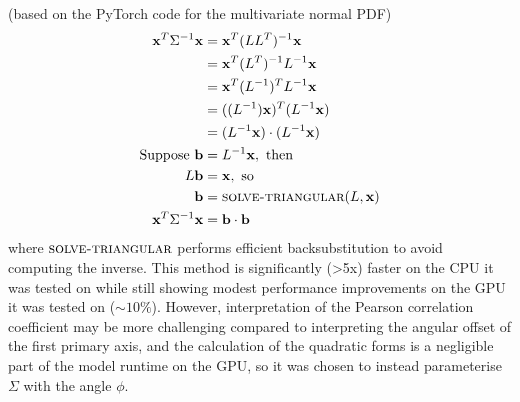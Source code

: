 \documentclass[a4paper, 12pt]{report}
\begin{document}
(based on the PyTorch code for the multivariate normal PDF)
\begin{align}
	\mathbf{x}^T\Sigma^{-1}\mathbf{x}
	&= \mathbf{x}^T(LL^T)^{-1}\mathbf{x}\\
	&= \mathbf{x}^T(L^T)^{-1}L^{-1}\mathbf{x}\\
	&= \mathbf{x}^T(L^{-1})^{T}L^{-1}\mathbf{x}\\
	&= ((L^{-1})\mathbf{x})^T(L^{-1}\mathbf{x})\\
	&= (L^{-1}\mathbf{x})\cdot(L^{-1}\mathbf{x})\\
\textrm{Suppose }\mathbf{b}&=L^{-1}\mathbf{x}, \textrm{ then} \nonumber\\
	L\mathbf{b}&=\mathbf{x}, \textrm{ so}\nonumber\\
	\mathbf{b}&= \textsc{solve-triangular}(L, \mathbf{x})\\
	\mathbf{x}^T\Sigma^{-1}\mathbf{x} &= \mathbf{b}\cdot\mathbf{b}
\end{align}
where $\textsc{solve-triangular}$ performs efficient backsubstitution to avoid computing the inverse. This method is significantly (>5x) faster on the CPU it was tested on while still showing modest performance improvements on the GPU it was tested on ($\sim 10\%$). However, interpretation of the Pearson correlation coefficient may be more challenging compared to interpreting the angular offset of the first primary axis, and the calculation of the quadratic forms is a negligible part of the model runtime on the GPU, so it was chosen to instead parameterise $\Sigma$ with the angle $\phi$.
\end{document}
